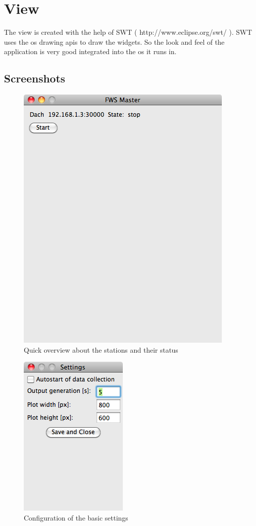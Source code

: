 
\section{View} %
\label{sec:view}

The view is created with the help of SWT ( http://www.eclipse.org/swt/ ). SWT uses the os drawing apis to draw the widgets. So the look and feel of the application is very good integrated into the os it runs in. 

\subsection{Screenshots} %
\label{sub:screenshots}

\begin{figure}[ht]
    \centering
    \includegraphics[width=0.6\linewidth]{master/mainview.png}
    \caption{Quick overview about the stations and their status}
    \label{fig:main}
\end{figure}

\begin{figure}[ht]
    \centering
    \includegraphics[width=0.4\linewidth]{master/settings.png}
    \caption{Configuration of the basic settings}
    \label{fig:settings}
\end{figure}

